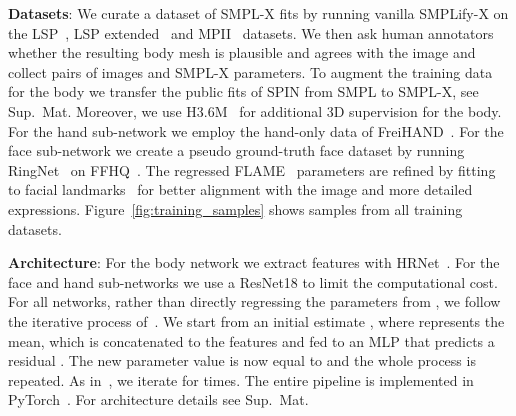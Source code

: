 \documentclass[runningheads]{llncs}
\newcommand{\smplx}{\mbox{SMPL-X}\xspace}
\newcommand{\smplifyx}{\mbox{SMPLify-X}\xspace}
\newcommand{\pseudogt}{pseudo \mbox{ground-truth}\xspace}
\newcommand{\freihand}{\mbox{FreiHAND}\xspace}
\newcommand{\smpl}{\mbox{SMPL}\xspace}
\newcommand{\flame}{\mbox{FLAME}\xspace}
\newcommand{\ringnet}{\mbox{RingNet}\xspace}
\newcommand{\pytorch}{\mbox{PyTorch}\xspace}
\newcommand{\threeD}{3D\xspace}
\newcommand{\supmat}{Sup.~Mat.\xspace}
\begin{document}
\textbf{Datasets}:
We curate a dataset of \smplx fits by running vanilla \smplifyx \cite{Pavlakos_2019_CVPR} on the LSP~\cite{johnson2010clustered}, LSP extended~\cite{johnson2011learning} and MPII~\cite{andriluka20142d} datasets.
We then ask human annotators whether the resulting body mesh is plausible and agrees with the image and collect  pairs of images and \smplx parameters.		To augment the training data for the body we transfer the public fits of SPIN
\cite{Kolotouros_2019_ICCV} from \smpl to \smplx, see \supmat
Moreover, we use H3.6M~\cite{ionescupapavaetal2014} for additional \threeD supervision for the body.
For the hand sub-network we employ the hand-only data of \freihand~\cite{Freihand2019}.
For the face sub-network we create a \pseudogt face dataset by running \ringnet~\cite{sanyal_2019_cvpr} on FFHQ~\cite{karras2019style}.
The regressed \flame~\cite{FLAME:SiggraphAsia2017} parameters are refined by fitting to facial landmarks~\cite{bulat2017far} for better alignment with the image and more detailed expressions.
Figure~\ref{fig:training_samples} shows samples from all training datasets.

\textbf{Architecture}:
For the body network we extract features  with HRNet~\cite{SunXLW19}.
For the face and hand sub-networks we use a ResNet18 \cite{he2016deep} to limit the computational cost.
For all networks, rather than directly regressing the parameters
 from , we follow the iterative process of~\cite{kanazawa_cvpr_2018}.
We start from an initial estimate , where  represents the mean,
which is concatenated to the features  and fed to an MLP that predicts a residual
. The
new parameter value is now equal to  and
the whole process is repeated. As in~\cite{kanazawa_cvpr_2018}, we iterate for  times.
The entire pipeline is implemented in \pytorch~\cite{pytorch}.
For architecture details see \supmat
\end{document}

